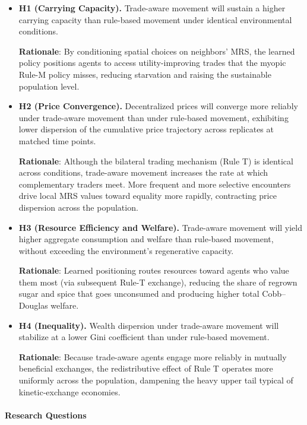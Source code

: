 \documentclass[pdflatex,sn-mathphys-num]{sn-jnl}%
\theoremstyle{thmstyleone}%
\theoremstyle{thmstyletwo}%
\theoremstyle{thmstylethree}%
\begin{document}
\begin{itemize}
\item \textbf{H1 (Carrying Capacity).} Trade-aware movement will sustain a higher carrying capacity than rule-based movement under identical environmental conditions.

\textbf{Rationale}: By conditioning spatial choices on neighbors' MRS, the learned policy positions agents to access utility-improving trades that the myopic Rule-M policy misses, reducing starvation and raising the sustainable population level.

\item \textbf{H2 (Price Convergence).} Decentralized prices will converge more reliably under trade-aware movement than under rule-based movement, exhibiting lower dispersion of the cumulative price trajectory across replicates at matched time points.

\textbf{Rationale}: Although the bilateral trading mechanism (Rule T) is identical across conditions, trade-aware movement increases the rate at which complementary traders meet. More frequent and more selective encounters drive local MRS values toward equality more rapidly, contracting price dispersion across the population.

\item \textbf{H3 (Resource Efficiency and Welfare).} Trade-aware movement will yield higher aggregate consumption and welfare than rule-based movement, without exceeding the environment's regenerative capacity.

\textbf{Rationale}: Learned positioning routes resources toward agents who value them most (via subsequent Rule-T exchange), reducing the share of regrown sugar and spice that goes unconsumed and producing higher total Cobb--Douglas welfare.

\item \textbf{H4 (Inequality).} Wealth dispersion under trade-aware movement will stabilize at a lower Gini coefficient than under rule-based movement.

\textbf{Rationale}: Because trade-aware agents engage more reliably in mutually beneficial exchanges, the redistributive effect of Rule T operates more uniformly across the population, dampening the heavy upper tail typical of kinetic-exchange economies.

\end{itemize}

\paragraph{Research Questions}
\end{document}
